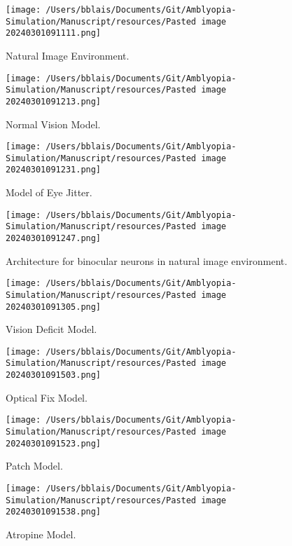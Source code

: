 \documentclass[
]{article}
\begin{document}
\begin{figure}
\centering
\texttt{[image: /Users/bblais/Documents/Git/Amblyopia-Simulation/Manuscript/resources/Pasted image 20240301091111.png]}
\caption{Natural Image Environment.}\label{fig:natural_images}
\end{figure}

\begin{figure}
\centering
\texttt{[image: /Users/bblais/Documents/Git/Amblyopia-Simulation/Manuscript/resources/Pasted image 20240301091213.png]}
\caption{Normal Vision
Model.}\label{fig:Pasted_image_20240301091213.png}
\end{figure}

\begin{figure}
\centering
\texttt{[image: /Users/bblais/Documents/Git/Amblyopia-Simulation/Manuscript/resources/Pasted image 20240301091231.png]}
\caption{Model of Eye
Jitter.}\label{fig:Pasted_image_20240301091231.png}
\end{figure}

\begin{figure}
\centering
\texttt{[image: /Users/bblais/Documents/Git/Amblyopia-Simulation/Manuscript/resources/Pasted image 20240301091247.png]}
\caption{Architecture for binocular neurons in natural image
environment.}\label{fig:Pasted_image_20240301091247.png}
\end{figure}

\begin{figure}
\centering
\texttt{[image: /Users/bblais/Documents/Git/Amblyopia-Simulation/Manuscript/resources/Pasted image 20240301091305.png]}
\caption{Vision Deficit
Model.}\label{fig:Pasted_image_20240301091305.png}
\end{figure}

\begin{figure}
\centering
\texttt{[image: /Users/bblais/Documents/Git/Amblyopia-Simulation/Manuscript/resources/Pasted image 20240301091503.png]}
\caption{Optical Fix Model.}\label{fig:Pasted_image_20240301091503.png}
\end{figure}

\begin{figure}
\centering
\texttt{[image: /Users/bblais/Documents/Git/Amblyopia-Simulation/Manuscript/resources/Pasted image 20240301091523.png]}
\caption{Patch Model.}\label{fig:Pasted_image_20240301091523.png}
\end{figure}

\begin{figure}
\centering
\texttt{[image: /Users/bblais/Documents/Git/Amblyopia-Simulation/Manuscript/resources/Pasted image 20240301091538.png]}
\caption{Atropine Model.}\label{fig:Pasted_image_20240301091538.png}
\end{figure}
\end{document}
